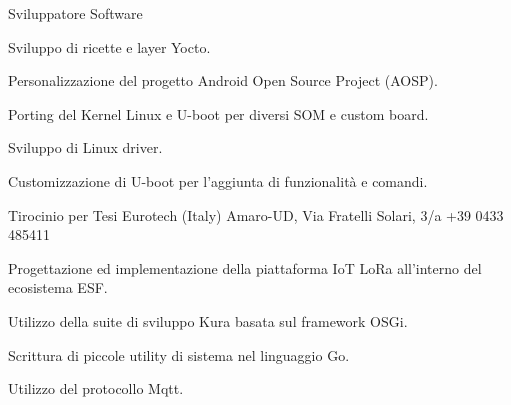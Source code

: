 \documentclass[italian,a4paper]{europasscv}
\begin{document}
\begin{europasscv}

		 {
			Sviluppatore Software
		}
		\ecvitem{} {
			\begin{ecvitemize}
				\item Sviluppo di ricette e layer Yocto.
				\item Personalizzazione del progetto Android Open Source Project
					(AOSP).
				\item Porting del Kernel Linux e U-boot per diversi SOM e custom
					board.
				\item Sviluppo di Linux driver.
				\item Customizzazione di U-boot per l'aggiunta di funzionalità
					e comandi.
			\end{ecvitemize}
		}

		 {
			Tirocinio per Tesi
		}
		\ecvitem{} {
			Eurotech (Italy)  Amaro-UD,
			Via Fratelli Solari, 3/a \newline +39 0433 485411
			\newline {}
		}
		\ecvitem{} {
			\begin{ecvitemize}
					\item Progettazione ed implementazione della piattaforma
						IoT LoRa all'interno del ecosistema ESF.
					\item Utilizzo della suite di sviluppo Kura basata sul
						framework OSGi.
					\item Scrittura di piccole utility di sistema nel
						linguaggio Go.
					\item Utilizzo del protocollo Mqtt.
			\end{ecvitemize}
		}


\end{europasscv}
\end{document}
